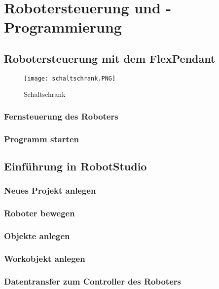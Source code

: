 
\chapter{Robotersteuerung und -Programmierung}

\section{Robotersteuerung mit dem FlexPendant}


\begin{wrapfigure}{l}{.4\textwidth}
\centering
\texttt{[image: schaltschrank.PNG]}
\vspace{-15pt}
\caption{Schaltschrank} 
\label{schaltschrank}
\end{wrapfigure}

\subsection{Fernsteuerung des Roboters}

\subsection{Programm starten}

\section{Einführung in RobotStudio}

\subsection{Neues Projekt anlegen}
\subsection{Roboter bewegen}
\subsection{Objekte anlegen}
\subsection{Workobjekt anlegen}
\subsection{Datentransfer zum Controller des Roboters}

